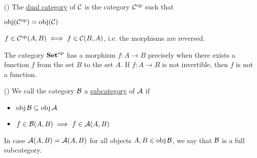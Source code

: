 \begin{definition}\label{def:dual_category}(\cite[construction 1.1.9]{Leinster2014})
  The \uline{dual category} of $\mathcal C$ is the category $\mathcal C^{\operatorname{op}}$ such that
  \begin{defenum}
    \item $\operatorname{obj}(\mathcal C^{\operatorname{op}}) = \operatorname{obj}(\mathcal C)$
    \item $f \in \mathcal C^{\operatorname{op}}(A, B) \iff f \in \mathcal C(B, A)$, i.e. the morphisms are reversed.
  \end{defenum}
\end{definition}

\begin{example}
  The category $\operatorname{\bold{Set}}^{\operatorname{op}}$ has a morphism $f: A \to B$ precisely when there exists a function $f$ from the set $B$ to the set $A$. If $f: A \to B$ is not invertible, then $f$ is not a function.
\end{example}

\begin{definition}\label{def:subcategory}(\cite[definition 1.2.18]{Leinster2014})
  We call the category $\mathcal B$ a \uline{subcategory} of $\mathcal A$ if
  \begin{itemize}
    \item $\operatorname{obj} \mathcal B \subseteq \operatorname{obj} \mathcal A$
    \item $f \in \mathcal B(A, B) \implies f \in \mathcal A(A, B)$
  \end{itemize}

  In case $\mathcal A(A, B) = \mathcal A(A, B)$ for all objects $A, B \in \operatorname{obj} \mathcal B$, we say that $\mathcal B$ is a full subcategory.
\end{definition}
